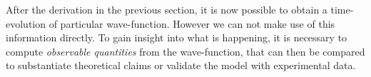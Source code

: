 After the derivation in the previous section, it is now possible to obtain a time-evolution of particular wave-function.
However we can not make use of this information directly. 
To gain insight into what is happening, it is necessary to compute \emph{observable quantities} from the wave-function, that can then be compared to substantiate theoretical claims or validate the model with experimental data.